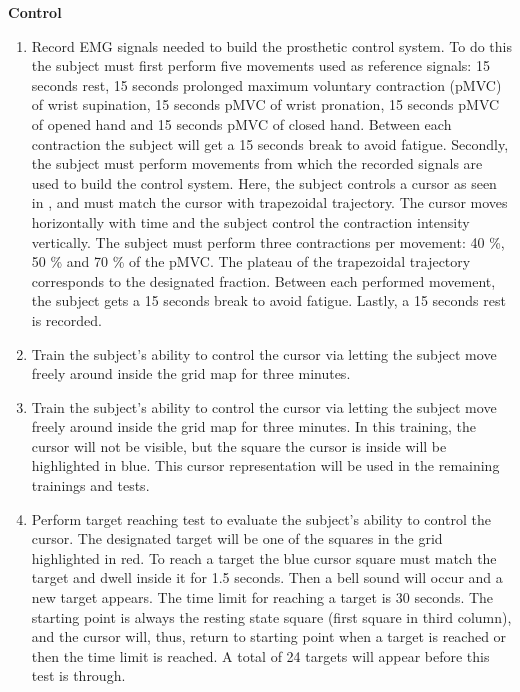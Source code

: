 \textbf{{Control}} \\
\vspace{-25pt}
\begin{enumerate}
	\item Record EMG signals needed to build the prosthetic control system. To do this the subject must first perform  five movements used as reference signals: 15 seconds rest, 15 seconds prolonged maximum voluntary contraction (pMVC) of wrist supination, 15 seconds pMVC of wrist pronation, 15 seconds pMVC of opened hand and 15 seconds pMVC of closed hand. Between each contraction the subject will get a 15 seconds break to avoid fatigue. Secondly, the subject must perform movements from which the recorded signals are used to build the control system. Here, the subject controls a cursor as seen in , and must match the cursor with trapezoidal trajectory. The cursor moves horizontally with time and the subject control the contraction intensity vertically. The subject must perform three contractions per movement: 40 \%, 50 \% and 70 \% of the pMVC. The plateau of the trapezoidal trajectory corresponds to the designated fraction. Between each performed movement, the subject gets a 15 seconds break to avoid fatigue. Lastly, a 15 seconds rest is recorded. 
	\item Train the subject's ability to control the cursor via letting the subject move freely around inside the grid map for three minutes.
	\item Train the subject's ability to control the cursor via letting the subject move freely around inside the grid map for three minutes. In this training, the cursor will not be visible, but the square the cursor is inside will be highlighted in blue. This cursor representation will be used in the remaining trainings and tests.
	\item Perform target reaching test to evaluate the subject's ability to control the cursor. The designated target will be one of the squares in the grid highlighted in red. To reach a target the blue cursor square must match the target and dwell inside it for 1.5 seconds. Then a bell sound will occur and a new target appears. The time limit for reaching a target is 30 seconds. The starting point is always the resting state square (first square in third column), and the cursor will, thus, return to starting point when a target is reached or then the time limit is reached. A total of 24 targets will appear before this test is through.
\end{enumerate}

